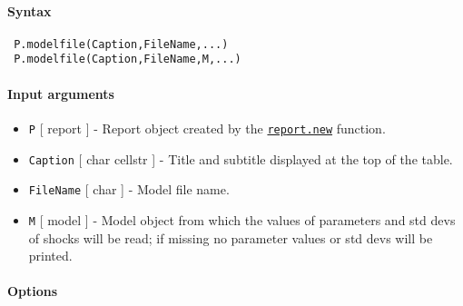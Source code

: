 


	\paragraph{Syntax}
 
 \begin{verbatim}
 P.modelfile(Caption,FileName,...)
 P.modelfile(Caption,FileName,M,...)
 \end{verbatim}
 
 \paragraph{Input arguments}
 
 \begin{itemize}
 \item
   \texttt{P} {[} report {]} - Report object created by the
   \href{report/new}{\texttt{report.new}} function.
 \item
   \texttt{Caption} {[} char \textbar{} cellstr {]} - Title and subtitle
   displayed at the top of the table.
 \item
   \texttt{FileName} {[} char {]} - Model file name.
 \item
   \texttt{M} {[} model {]} - Model object from which the values of
   parameters and std devs of shocks will be read; if missing no
   parameter values or std devs will be printed.
 \end{itemize}
 
 \paragraph{Options}
 
